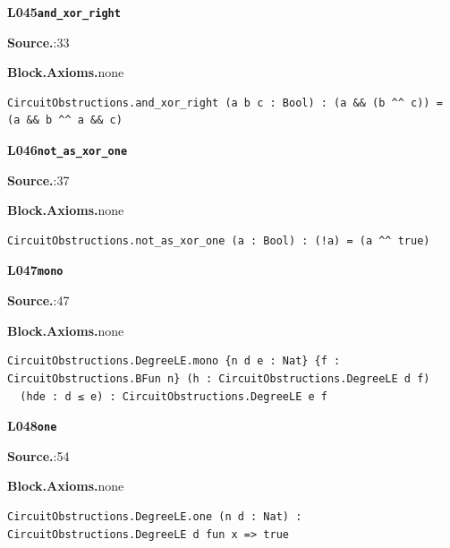 \par\medskip\noindent\begin{minipage}{\textwidth}
{\small\bfseries L045\enspace\texttt{and\_xor\_right}\par}
{\footnotesize\raggedright\textbf{Source.}\enspace{}:33\par
\textbf{Block.}\quad\textbf{Axioms.}\enspace none\par}\nopagebreak
\begin{lstlisting}
CircuitObstructions.and_xor_right (a b c : Bool) : (a && (b ^^ c)) = (a && b ^^ a && c)
\end{lstlisting}
\end{minipage}\par

\par\medskip\noindent\begin{minipage}{\textwidth}
{\small\bfseries L046\enspace\texttt{not\_as\_xor\_one}\par}
{\footnotesize\raggedright\textbf{Source.}\enspace{}:37\par
\textbf{Block.}\quad\textbf{Axioms.}\enspace none\par}\nopagebreak
\begin{lstlisting}
CircuitObstructions.not_as_xor_one (a : Bool) : (!a) = (a ^^ true)
\end{lstlisting}
\end{minipage}\par

\par\medskip\noindent\begin{minipage}{\textwidth}
{\small\bfseries L047\enspace\texttt{mono}\par}
{\footnotesize\raggedright\textbf{Source.}\enspace{}:47\par
\textbf{Block.}\quad\textbf{Axioms.}\enspace none\par}\nopagebreak
\begin{lstlisting}
CircuitObstructions.DegreeLE.mono {n d e : Nat} {f : CircuitObstructions.BFun n} (h : CircuitObstructions.DegreeLE d f)
  (hde : d ≤ e) : CircuitObstructions.DegreeLE e f
\end{lstlisting}
\end{minipage}\par

\par\medskip\noindent\begin{minipage}{\textwidth}
{\small\bfseries L048\enspace\texttt{one}\par}
{\footnotesize\raggedright\textbf{Source.}\enspace{}:54\par
\textbf{Block.}\quad\textbf{Axioms.}\enspace none\par}\nopagebreak
\begin{lstlisting}
CircuitObstructions.DegreeLE.one (n d : Nat) : CircuitObstructions.DegreeLE d fun x => true
\end{lstlisting}
\end{minipage}\par

